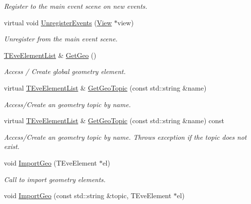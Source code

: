 \begin{DoxyCompactItemize}
\begin{DoxyCompactList}\small\item\em Register to the main event scene on new events. \end{DoxyCompactList}\item 
virtual void \hyperlink{class_d_d4hep_1_1_display_ab681bf3f69e91271a5c8ec36fb991207}{Unregister\+Events} (\hyperlink{class_d_d4hep_1_1_view}{View} $\ast$view)
\begin{DoxyCompactList}\small\item\em Unregister from the main event scene. \end{DoxyCompactList}\item 
\hyperlink{class_t_eve_element_list}{T\+Eve\+Element\+List} \& \hyperlink{class_d_d4hep_1_1_display_a6320adb59a4092821ef4623da5547277}{Get\+Geo} ()
\begin{DoxyCompactList}\small\item\em Access / Create global geometry element. \end{DoxyCompactList}\item 
virtual \hyperlink{class_t_eve_element_list}{T\+Eve\+Element\+List} \& \hyperlink{class_d_d4hep_1_1_display_a498d6b2e33dec5997afaa362815c5031}{Get\+Geo\+Topic} (const std\+::string \&name)
\begin{DoxyCompactList}\small\item\em Access/\+Create an geometry topic by name. \end{DoxyCompactList}\item 
virtual \hyperlink{class_t_eve_element_list}{T\+Eve\+Element\+List} \& \hyperlink{class_d_d4hep_1_1_display_a466459e53efe1360d8917ee777d26f36}{Get\+Geo\+Topic} (const std\+::string \&name) const
\begin{DoxyCompactList}\small\item\em Access/\+Create an geometry topic by name. Throws exception if the topic does not exist. \end{DoxyCompactList}\item 
void \hyperlink{class_d_d4hep_1_1_display_aca9678df816ec896a38ff9c31019fba2}{Import\+Geo} (T\+Eve\+Element $\ast$el)
\begin{DoxyCompactList}\small\item\em Call to import geometry elements. \end{DoxyCompactList}\item 
void \hyperlink{class_d_d4hep_1_1_display_a6184ad75da79c23b85cddf79b664be6f}{Import\+Geo} (const std\+::string \&topic, T\+Eve\+Element $\ast$el)

\end{DoxyCompactItemize}
